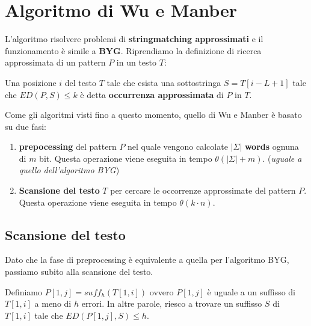 \section{Algoritmo di Wu e Manber}
L'algoritmo risolvere problemi di \textbf{stringmatching approssimati} e il funzionamento
è simile a \textbf{BYG}.
Riprendiamo la definizione di ricerca approssimata di un pattern $P$ in un testo $T$:
\begin{definizione}
    Una posizione $i$ del testo $T$ tale che esista una sottostringa $S =T[i - L + 1]$
    tale che $ED(P, S) \leq k$ è detta \textbf{occurrenza approssimata} di $P$ in $T$.
\end{definizione}

Come gli algoritmi visti fino a questo momento, quello di Wu e Manber è basato su due fasi:
\begin{enumerate}
    \item \textbf{prepocessing} del pattern $P$ nel quale vengono calcolate $|\Sigma|$
          \textbf{words} ognuna di $m$ bit. Questa operazione viene eseguita in tempo
          $\theta(|\Sigma| + m)$. (\textit{uguale a quello dell'algoritmo BYG})
    \item \textbf{Scansione del testo} $T$ per cercare le occorrenze approssimate del pattern $P$.
          Questa operazione viene eseguita in tempo $\theta(k \cdot n)$.
\end{enumerate}
\subsection{Scansione del testo}
Dato che la fase di preprocessing è equivalente a quella per l'algoritmo BYG,
passiamo subito alla scansione del testo.

\begin{definizione}
    Definiamo $P[1, j] = suff_h(T[1, i])$ ovvero $P[1, j]$ è uguale a un
    suffisso di $T[1, i]$ a meno di $h$ errori. In altre parole, riesco a trovare un
    suffisso $S$ di $T[1, i]$ tale che $ED(P[1, j], S) \leq h$.
\end{definizione}

